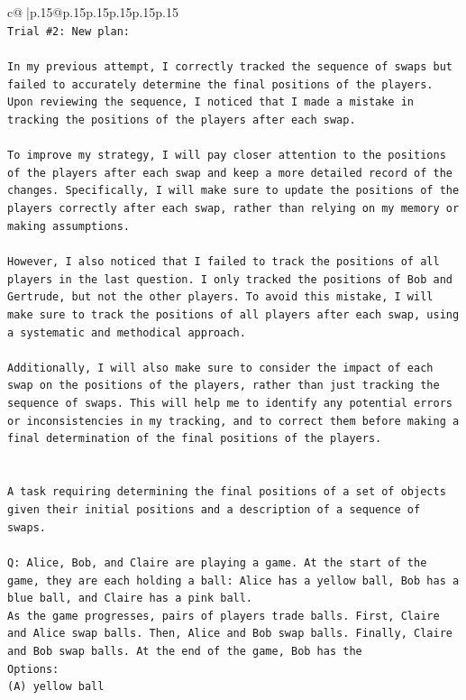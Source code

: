 \documentclass{article}
\begin{document}
{\begin{supertabular}{c@{$\;$}|p{.15\linewidth}@{}p{.15\linewidth}p{.15\linewidth}p{.15\linewidth}p{.15\linewidth}p{.15\linewidth}}
{{{\\ 
\texttt{Trial \#2: New plan: } \\
\\ 
\texttt{In my previous attempt, I correctly tracked the sequence of swaps but failed to accurately determine the final positions of the players. Upon reviewing the sequence, I noticed that I made a mistake in tracking the positions of the players after each swap. } \\
\\ 
\texttt{To improve my strategy, I will pay closer attention to the positions of the players after each swap and keep a more detailed record of the changes. Specifically, I will make sure to update the positions of the players correctly after each swap, rather than relying on my memory or making assumptions. } \\
\\ 
\texttt{However, I also noticed that I failed to track the positions of all players in the last question. I only tracked the positions of Bob and Gertrude, but not the other players. To avoid this mistake, I will make sure to track the positions of all players after each swap, using a systematic and methodical approach. } \\
\\ 
\texttt{Additionally, I will also make sure to consider the impact of each swap on the positions of the players, rather than just tracking the sequence of swaps. This will help me to identify any potential errors or inconsistencies in my tracking, and to correct them before making a final determination of the final positions of the players.} \\
\\ 
\\ 
\texttt{A task requiring determining the final positions of a set of objects given their initial positions and a description of a sequence of swaps.} \\
\\ 
\texttt{Q: Alice, Bob, and Claire are playing a game. At the start of the game, they are each holding a ball: Alice has a yellow ball, Bob has a blue ball, and Claire has a pink ball.} \\
\texttt{As the game progresses, pairs of players trade balls. First, Claire and Alice swap balls. Then, Alice and Bob swap balls. Finally, Claire and Bob swap balls. At the end of the game, Bob has the} \\
\texttt{Options:} \\
\texttt{(A) yellow ball} \\
}}}
\end{supertabular}}
\end{document}
